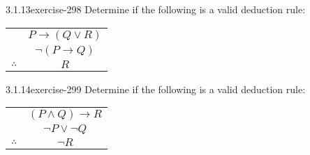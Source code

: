 \documentclass[twoside,11pt,]{book}
\numberwithin{equation}{chapter}
\newcommand{\hrulethin}  {\noalign{\hrule height 0.04em}}
\newcommand{\imp}{\rightarrow}
\begin{document}
\begin{divisionsolution}{3.1.13}{}{exercise-298}%
\hypertarget{p-3985}{}%
Determine if the following is a valid deduction rule:%
\begin{sidebyside}{1}{0}{0}{0}%
\begin{sbspanel}{1}%
{\centering%
\begin{tabular}{cc}
&\(P \imp (Q \vee R)\)\tabularnewline[0pt]
&\(\neg(P \imp Q)\)\tabularnewline\hrulethin
\(\therefore\)&\(R\)
\end{tabular}
\par}
\end{sbspanel}%
\end{sidebyside}%
\end{divisionsolution}%
\begin{divisionsolution}{3.1.14}{}{exercise-299}%
\hypertarget{p-3986}{}%
Determine if the following is a valid deduction rule:%
\begin{sidebyside}{1}{0}{0}{0}%
\begin{sbspanel}{1}%
{\centering%
\begin{tabular}{cc}
&\((P \wedge Q) \imp R\)\tabularnewline[0pt]
&\(\neg P \vee \neg Q\)\tabularnewline\hrulethin
\(\therefore\)&\(\neg R\)
\end{tabular}
\par}
\end{sbspanel}%
\end{sidebyside}%
\end{divisionsolution}%
\end{document}
